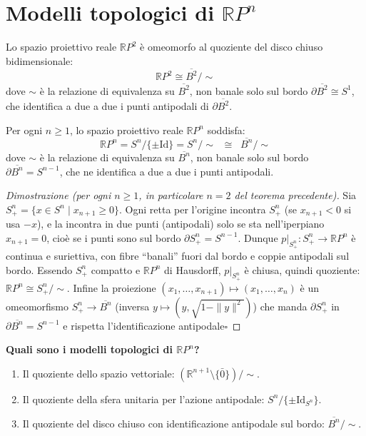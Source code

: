 \section{Modelli topologici di $\mathbb{R}P^n$}

\begin{teo}
Lo spazio proiettivo reale $\mathbb{R}P^2$ è omeomorfo al quoziente del disco chiuso bidimensionale:
\[
\mathbb{R}P^2 \cong \overline{B^2} \big/ \sim
\]
dove $\sim$ è la relazione di equivalenza su $\overline{B^2}$, non banale solo sul bordo $\partial \overline{B^2} \cong S^1$, che identifica a due a due i punti antipodali di $\partial \overline{B^2}$.
\end{teo}

\vspace{1em}

\begin{prop}
Per ogni $n \geqslant 1$, lo spazio proiettivo reale $\mathbb{R}P^n$ soddisfa:
\[
\mathbb{R}P^n = S^n \big/ \{\pm \mathrm{Id}\} = S^n \big/ \sim \;\;\cong\;\; \overline{B^n} \big/ \sim
\]
dove $\sim$ è la relazione di equivalenza su $\overline{B^n}$, non banale solo sul bordo $\partial \overline{B^n} = S^{n-1}$, che ne identifica a due a due i punti antipodali.
\end{prop}

\begin{proof}[Dimostrazione (per ogni $n \geqslant 1$, in particolare $n=2$ del teorema precedente)]
Sia $S^n_+ = \{x \in S^n \mid x_{n+1} \geqslant 0\}$. Ogni retta per l'origine incontra $S^n_+$ (se $x_{n+1} < 0$ si usa $-x$), e la incontra in due punti (antipodali) solo se sta nell'iperpiano $x_{n+1} = 0$, cio\`e se i punti sono sul bordo $\partial S^n_+ = S^{n-1}$. Dunque $p|_{S^n_+}: S^n_+ \to \mathbb{R}P^n$ \`e continua e suriettiva, con fibre ``banali'' fuori dal bordo e coppie antipodali sul bordo. Essendo $S^n_+$ compatto e $\mathbb{R}P^n$ di Hausdorff, $p|_{S^n_+}$ \`e chiusa, quindi quoziente: $\mathbb{R}P^n \cong S^n_+/\!\sim$. Infine la proiezione $(x_1, \dots, x_{n+1}) \mapsto (x_1, \dots, x_n)$ \`e un omeomorfismo $S^n_+ \to \overline{B^n}$ (inversa $y \mapsto (y, \sqrt{1-\|y\|^2})$) che manda $\partial S^n_+$ in $\partial \overline{B^n} = S^{n-1}$ e rispetta l'identificazione antipodale\hfill$\square$
\end{proof}

\begin{ejercicio*}
\textbf{Quali sono i modelli topologici di $\mathbb{R}P^n$?}
\begin{enumerate}
    \item Il quoziente dello spazio vettoriale: $\left(\mathbb{R}^{n+1} \setminus \{\bar{0}\}\right) / \sim$.
    \item Il quoziente della sfera unitaria per l'azione antipodale: $S^n / \{\pm \mathrm{Id}_{S^n}\}$.
    \item Il quoziente del disco chiuso con identificazione antipodale sul bordo: $\overline{B^n} / \sim$.
\end{enumerate}
\end{ejercicio*}

